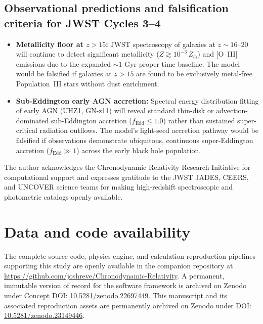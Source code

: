 \documentclass[aps,prd,reprint,superscriptaddress,nofootinbib,floatfix,amsmath,amssymb]{revtex4-2}
\begin{document}
\subsection{Observational predictions and falsification criteria for JWST Cycles 3--4}
\begin{itemize}
    \item \textbf{Metallicity floor at $z > 15$:} JWST spectroscopy of galaxies at $z \sim 16\text{--}20$ will continue to detect significant metallicity ($Z \gtrsim 10^{-3}\,Z_\odot$) and [O~III] emissions due to the expanded $\sim 1\text{ Gyr}$ proper time baseline. The model would be falsified if galaxies at $z > 15$ are found to be exclusively metal-free Population~III stars without dust enrichment.
    \item \textbf{Sub-Eddington early AGN accretion:} Spectral energy distribution fitting of early AGN (UHZ1, GN-z11) will reveal standard thin-disk or advection-dominated sub-Eddington accretion ($f_{\text{Edd}} \le 1.0$) rather than sustained super-critical radiation outflows. The model's light-seed accretion pathway would be falsified if observations demonstrate ubiquitous, continuous super-Eddington accretion ($f_{\text{Edd}} \gg 1$) across the early black hole population.
\end{itemize}

\begin{acknowledgments}
The author acknowledges the Chronodynamic Relativity Research Initiative for computational support and expresses gratitude to the JWST JADES, CEERS, and UNCOVER science teams for making high-redshift spectroscopic and photometric catalogs openly available.
\end{acknowledgments}

\section*{Data and code availability}
The complete source code, physics engine, and calculation reproduction pipelines supporting this study are openly available in the companion repository at \url{https://github.com/joshreve/Chronodynamic-Relativity}. A permanent, immutable version of record for the software framework is archived on Zenodo under Concept DOI: \href{https://doi.org/10.5281/zenodo.22697449}{10.5281/zenodo.22697449}. This manuscript and its associated reproduction assets are permanently archived on Zenodo under DOI: \href{https://doi.org/10.5281/zenodo.23149446}{10.5281/zenodo.23149446}.


\end{document}
